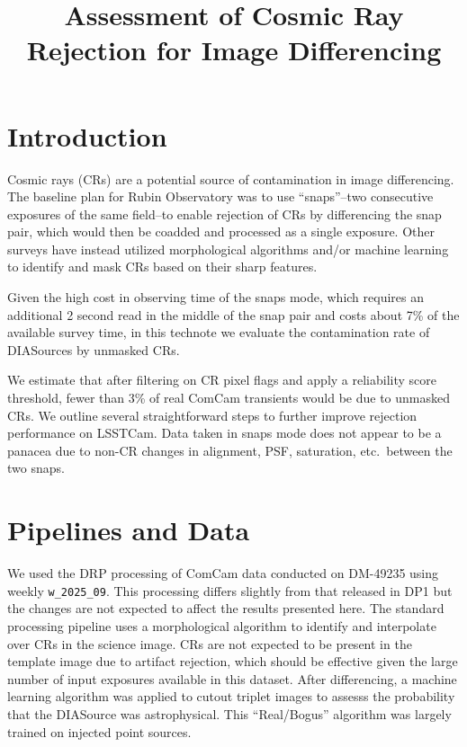 \documentclass[DM,lsstdraft,authoryear,toc]{lsstdoc}
\title{Assessment of Cosmic Ray Rejection for Image Differencing}
\date{\vcsDate}
\begin{document}
\maketitle

\section{Introduction} \label{sec:intro}

Cosmic rays (CRs) are a potential source of contamination in image differencing.
The baseline plan for Rubin Observatory was to use ``snaps''--two consecutive exposures of the same field--to enable rejection of CRs by differencing the snap pair, which would then be coadded and processed as a single exposure.
Other surveys have instead utilized morphological algorithms and/or machine learning to identify and mask CRs based on their sharp features.

Given the high cost in observing time of the snaps mode, which requires an additional 2 second read in the middle of the snap pair and costs about 7\% of the available survey time, in this technote we evaluate the contamination rate of DIASources by unmasked CRs.

We estimate that after filtering on CR pixel flags and apply a reliability score threshold, fewer than 3\% of real ComCam transients would be due to unmasked CRs.  
We outline several straightforward steps to further improve rejection performance on LSSTCam.
Data taken in snaps mode does not appear to be a panacea due to non-CR changes in alignment, PSF, saturation, etc.\ between the two snaps.


\section{Pipelines and Data} \label{sec:pipelines}

We used the DRP processing of ComCam data conducted on DM-49235 using weekly \texttt{w\_2025\_09}.
This processing differs slightly from that released in DP1 but the changes are not expected to affect the results presented here.
The standard processing pipeline uses a morphological algorithm to identify and interpolate over CRs in the science image.
CRs are not expected to be present in the template image due to artifact rejection, which should be effective given the large number of input exposures available in this dataset.
After differencing, a machine learning algorithm was applied to cutout triplet images to assesss the probability that the DIASource was astrophysical.
This ``Real/Bogus'' algorithm was largely trained on injected point sources.
\end{document}
